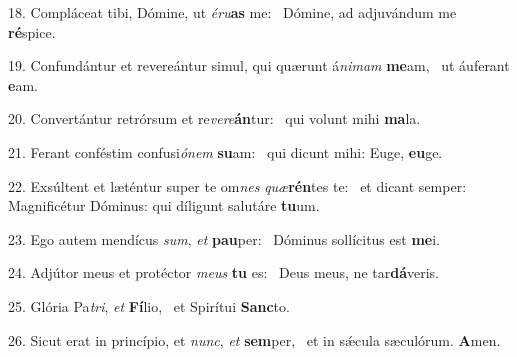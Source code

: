 18. Compláceat tibi, Dómine, ut \textit{é}\textit{ru}\textbf{as} me: \ast\  Dómine, ad adjuvándum me \textbf{ré}spice.\

19. Confundántur et revereántur simul, qui quærunt á\textit{ni}\textit{mam} \textbf{me}am, \ast\  ut áuferant \textbf{e}am.\

20. Convertántur retrórsum et re\textit{ve}\textit{re}\textbf{án}tur: \ast\  qui volunt mihi \textbf{ma}la.\

21. Ferant conféstim confusi\textit{ó}\textit{nem} \textbf{su}am: \ast\  qui dicunt mihi: Euge, \textbf{eu}ge.\

22. Exsúltent et læténtur super te om\textit{nes} \textit{quæ}\textbf{rén}tes te: \ast\  et dicant semper: Magnificétur Dóminus: qui díligunt salutáre \textbf{tu}um.\

23. Ego autem mendícus \textit{sum}, \textit{et} \textbf{pau}per: \ast\  Dóminus sollícitus est \textbf{me}i.\

24. Adjútor meus et protéctor \textit{me}\textit{us} \textbf{tu} es: \ast\  Deus meus, ne tar\textbf{dá}veris.\

25. Glória Pa\textit{tri}, \textit{et} \textbf{Fí}lio, \ast\  et Spirítui \textbf{Sanc}to.\

26. Sicut erat in princípio, et \textit{nunc}, \textit{et} \textbf{sem}per, \ast\  et in sǽcula sæculórum. \textbf{A}men.\

